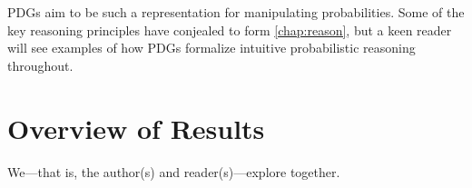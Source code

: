 
PDGs aim to be such a representation for manipulating probabilities.
Some of the key reasoning principles have conjealed to form \cref{chap:reason},
but a keen reader will see examples of how PDGs formalize intuitive probabilistic reasoning throughout. 

\section{Overview of Results}

\TODO




We---that is, the author(s) and reader(s)---explore together. 
